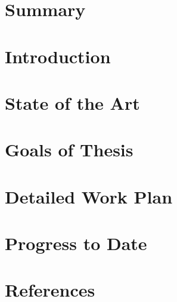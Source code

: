 \documentclass[%
   11pt,              %
   english,           %
   a4paper,           %
   DIV12,             %
	 parskip=half
]{scrartcl}%
\renewcommand{\color}[2]{#2} %
\newif\ifMaxPages
\newcommand{\onlyIfMaxPages}[1]{\ifMaxPages{\color{red}{#1}}\fi}
\begin{document}


\section{Summary\onlyIfMaxPages{ (max. 1/2 page)}}


\onlyIfMaxPages{\pagebreak}
\section{Introduction\onlyIfMaxPages{ (min. 1/2 page)}}


\onlyIfMaxPages{\pagebreak}
\section{State of the Art\onlyIfMaxPages{ (min. 1 page)}}


\onlyIfMaxPages{\pagebreak}
\section{Goals of Thesis\onlyIfMaxPages{ (min. 1 page)}}\label{sec:goal_of_thesis}


\onlyIfMaxPages{\pagebreak}
\section{Detailed Work Plan\onlyIfMaxPages{ (min. 1/2 page)}}
\label{sec:detailed_work_plan}

\onlyIfMaxPages{\pagebreak}
\section{Progress to Date\onlyIfMaxPages{ (min. 1/4 page)}}


% 

\pagebreak
\section{References\onlyIfMaxPages{ (max. 1 page)}}


% 
\end{document}
